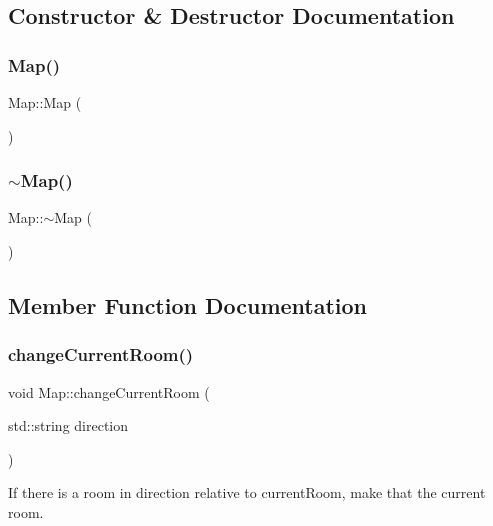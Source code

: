 \subsection{Constructor \& Destructor Documentation}
\mbox{\label{class_map_a0f5ad0fd4563497b4214038cbca8b582}} 
\subsubsection{\texorpdfstring{Map()}{Map()}}
{\footnotesize\ttfamily Map\+::\+Map (\begin{DoxyParamCaption}{ }\end{DoxyParamCaption})}

\mbox{\label{class_map_aa403fbe09394ccf39747588f5168e3b2}} 
\subsubsection{\texorpdfstring{$\sim$\+Map()}{~Map()}}
{\footnotesize\ttfamily Map\+::$\sim$\+Map (\begin{DoxyParamCaption}{ }\end{DoxyParamCaption})\hspace{0.3cm}{\ttfamily [virtual]}}



\subsection{Member Function Documentation}
\mbox{\label{class_map_ab5777622a2e795cb5b36c7bd4843e5a8}} 
\subsubsection{\texorpdfstring{change\+Current\+Room()}{changeCurrentRoom()}}
{\footnotesize\ttfamily void Map\+::change\+Current\+Room (\begin{DoxyParamCaption}\item[{std\+::string}]{direction }\end{DoxyParamCaption})}



If there is a room in direction relative to current\+Room, make that the current room. 


